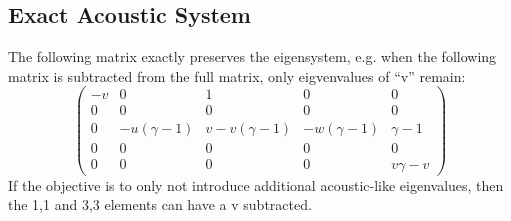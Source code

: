 \documentclass[letterpaper,11pt,nointlimits,reqno]{amsart}
\begin{document}
\subsection{Exact Acoustic System}
The following matrix exactly preserves the eigensystem, e.g. when the following matrix is subtracted from the full matrix, only eigvenvalues of ``v'' remain:
\begin{equation}\label{eq:reduced}
\left(
\begin{array}{ccccc}
 -v & 0 & 1 & 0 & 0 \\
 0 & 0 & 0 & 0 & 0 \\
 0 & -u (\gamma -1) & v-v (\gamma -1) & -w (\gamma -1) & \gamma -1 \\
 0 & 0 & 0 & 0 & 0 \\
 0 & 0 & 0 & 0 & v \gamma -v
\end{array}
\right)
\end{equation}
If the objective is to only not introduce additional acoustic-like eigenvalues, then the 1,1 and 3,3 elements can have a v subtracted.
\end{document}
